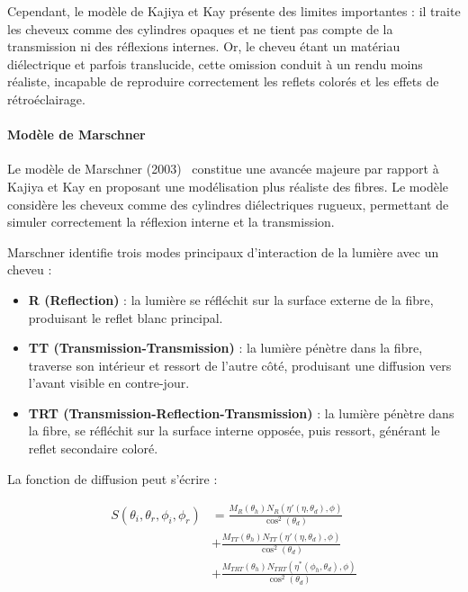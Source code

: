 Cependant, le modèle de Kajiya et Kay présente des limites importantes : il traite les cheveux comme des cylindres opaques et ne tient pas compte de la transmission ni des réflexions internes. Or, le cheveu étant un matériau diélectrique et parfois translucide, cette omission conduit à un rendu moins réaliste, incapable de reproduire correctement les reflets colorés et les effets de rétroéclairage.

\paragraph{Modèle de Marschner}

Le modèle de Marschner (2003)~\cite{marschner2003} constitue une avancée majeure par rapport à Kajiya et Kay en proposant une modélisation plus réaliste des fibres. Le modèle considère les cheveux comme des cylindres diélectriques rugueux, permettant de simuler correctement la réflexion interne et la transmission.

Marschner identifie trois modes principaux d'interaction de la lumière avec un cheveu :

\begin{itemize}[noitemsep]
    \item \textbf{R (Reflection)} : la lumière se réfléchit sur la surface externe de la fibre, produisant le reflet blanc principal.
    \item \textbf{TT (Transmission-Transmission)} : la lumière pénètre dans la fibre, traverse son intérieur et ressort de l'autre côté, produisant une diffusion vers l'avant visible en contre-jour.
    \item \textbf{TRT (Transmission-Reflection-Transmission)} : la lumière pénètre dans la fibre, se réfléchit sur la surface interne opposée, puis ressort, générant le reflet secondaire coloré.
\end{itemize}

La fonction de diffusion peut s'écrire :

\begin{equation}
\begin{aligned}
S(\theta_i, \theta_r, \phi_i, \phi_r) &= \frac{M_R(\theta_h) N_R(\eta'(\eta, \theta_d), \phi)}{\cos^2(\theta_d)} \\
&+ \frac{M_{TT}(\theta_h) N_{TT}(\eta'(\eta, \theta_d), \phi)}{\cos^2(\theta_d)} \\
&+ \frac{M_{TRT}(\theta_h) N_{TRT}(\eta^*(\phi_h, \theta_d), \phi)}{\cos^2(\theta_d)}
\end{aligned}
\end{equation}

